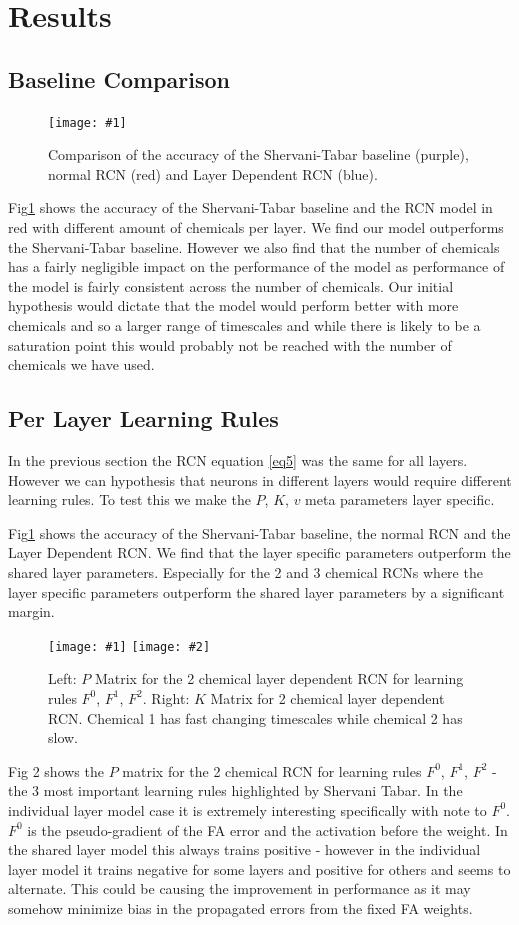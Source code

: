 \documentclass[a4paper, 11pt, oneside]{report}
\newcommand{\centreImage}[2]{
	\begin{figure}[H]
		\centering
		\texttt{[image: \#1]}
		\caption{#2}
        \label{fig:#1}
	\end{figure}
}
\newcommand{\centreImageTwo}[3]{
    \begin{figure}[H]
        \centering
        \texttt{[image: \#1]}
        \texttt{[image: \#2]}
        \caption{#3}
        \label{fig:#1}
    \end{figure}
}
\begin{document}
\section*{Results}

\subsection*{Baseline Comparison}

\centreImage{individual_3_error.png}{Comparison of the accuracy of the Shervani-Tabar baseline (purple), normal RCN (red) and Layer Dependent RCN (blue).}

Fig\ref{fig:individual_3_error.png} shows the accuracy of the Shervani-Tabar baseline and the RCN model in red with different amount of chemicals per layer.
We find our model outperforms the Shervani-Tabar baseline. However we also find
that the number of chemicals has a fairly negligible impact on the performance of the model as performance of the model
is fairly consistent across the number of chemicals.
Our initial hypothesis would
dictate that the model would perform better with more chemicals and so a larger range of timescales and while there is likely to be a saturation point
this would probably not be reached with the number of chemicals we have used.

\subsection*{Per Layer Learning Rules}

In the previous section the RCN equation \ref{eq5} was the same for all layers. However we can hypothesis that neurons in different layers would require different learning rules.
To test this we make the $P$, $K$, $v$ meta parameters layer specific.

Fig\ref{fig:individual_3_error.png} shows the accuracy of the Shervani-Tabar baseline, the normal RCN and the Layer Dependent RCN.
We find that the layer specific parameters outperform the shared layer parameters.
Especially for the 2 and 3 chemical RCNs where the layer specific parameters outperform the shared layer parameters by a significant margin.

\centreImageTwo{Layers.png}{layerK.png}{Left: $P$ Matrix for the 2 chemical layer dependent RCN for learning rules $F^0$, $F^1$, $F^2$.
Right: $K$ Matrix for 2 chemical layer dependent RCN. Chemical 1 has fast changing timescales while chemical 2 has slow.}

Fig 2 shows the $P$ matrix for the 2 chemical RCN for learning rules $F^0$, $F^1$, $F^2$ - the 3 
most important learning rules highlighted by Shervani Tabar. In the individual layer model case it is extremely interesting specifically
with note to $F^0$. $F^0$ is the pseudo-gradient of the FA error and the activation before the weight. In the shared layer model
this always trains positive - however in the individual layer model it trains negative for some layers and positive for others and seems to alternate.
This could be causing the improvement in performance as it may somehow minimize bias in the propagated errors from the fixed FA weights.
\end{document}
